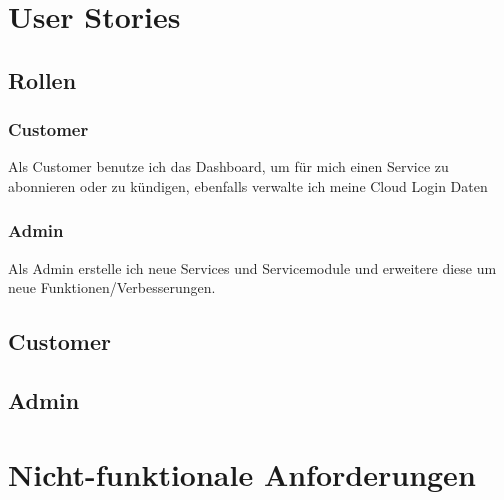 \section{User Stories}
\subsection{Rollen}
\subsubsection{Customer}
Als Customer benutze ich das Dashboard, um für mich einen Service zu abonnieren oder zu 
kündigen, ebenfalls verwalte ich meine Cloud Login Daten
\subsubsection{Admin}
Als Admin erstelle ich neue Services und Servicemodule und erweitere diese um 
neue Funktionen/Verbesserungen.
\subsection{Customer}





 
  
 \subsection{Admin}
 
 
 
 

\newpage

\section{Nicht-funktionale Anforderungen}


